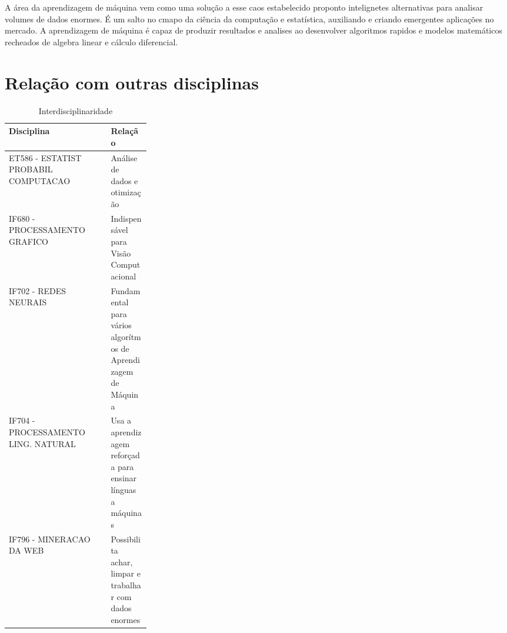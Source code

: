 \documentclass[10pt]{article}
\begin{document}
A área da aprendizagem de máquina vem como uma solução a esse caos estabelecido proponto intelignetes alternativas para analisar volumes de dados enormes. É um salto no cmapo da ciência da computação e estatística, auxiliando e criando emergentes aplicações no mercado. A aprendizagem de máquina é capaz de produzir resultados e analises ao desenvolver algoritmos rapidos e modelos matemáticos recheados de algebra linear e cálculo diferencial.
\cite{tom1997learning}

\section{Relação com outras disciplinas}

\begin{table}[h!]
  \begin{center}
    \caption{Interdisciplinaridade \cite{yaser2012learning}}
    \label{tab:table1}
     \begin{tabular}{|l|p{0.28\linewidth}|}
      \textbf{Disciplina} & \textbf{Relação}\\
      \hline
       ET586 - ESTATIST PROBABIL COMPUTACAO & Análise de dados e otimização\newline  \\\hline
       IF680 - PROCESSAMENTO GRAFICO  & Indispensável para Visão  Computacional \\\hline
       IF702 - REDES NEURAIS & Fundamental para vários algorítmos de Aprendizagem de Máquina  \\\hline
       IF704 - PROCESSAMENTO LING. NATURAL & Usa a aprendizagem reforçada para ensinar línguas a máquinas  \\\hline
       IF796 - MINERACAO DA WEB & Possibilita achar, limpar e trabalhar com dados enormes
    \end{tabular}
  \end{center}
\end{table}

\newpage


\end{document}
